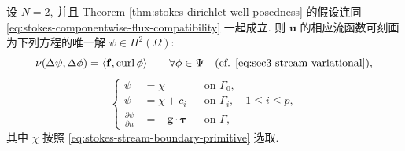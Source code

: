 \setcounter{statement}{4}
\begin{Theorem}\label{thm:stokes-two-dimensional-stream-function}
设 $N=2$, 并且 Theorem
\ref{thm:stokes-dirichlet-well-posedness} 的假设连同
\eqref{eq:stokes-componentwise-flux-compatibility} 一起成立.
则 $\mathbf{u}$ 的相应流函数可刻画为下列方程的唯一解
$\psi\in H^2(\Omega)$:
\begin{equation}\label{eq:stokes-stream-biharmonic-variational}
\nu(\Delta\psi,\Delta\phi)
=\langle\mathbf{f},\operatorname{curl}\phi\rangle
\qquad
\forall\phi\in\Psi
\quad
(\text{cf. }\eqref{eq:sec3-stream-variational}),
\end{equation}
\begin{equation}\label{eq:stokes-stream-boundary-conditions}
\left\{
\begin{aligned}
\psi&=\chi
&&\text{on }\Gamma_0,\\
\psi&=\chi+c_i
&&\text{on }\Gamma_i,
\quad 1\le i\le p,\\
\frac{\partial\psi}{\partial n}
&=-\mathbf{g}\cdot\boldsymbol{\tau}
&&\text{on }\Gamma,
\end{aligned}
\right.
\end{equation}
其中 $\chi$ 按照
\eqref{eq:stokes-stream-boundary-primitive} 选取.
\end{Theorem}
